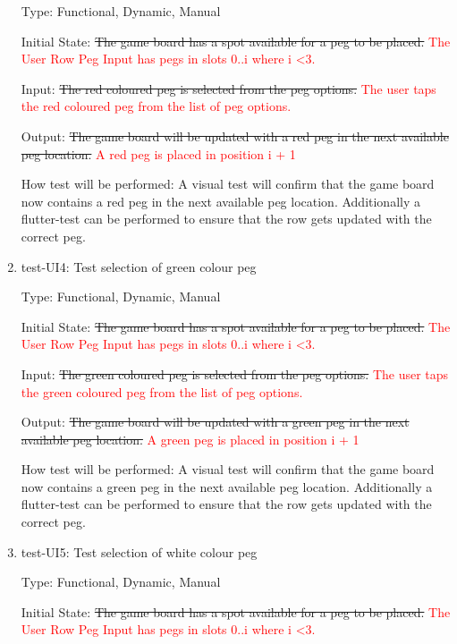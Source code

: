 \documentclass[12pt, titlepage]{article}
\begin{document}
\begin{enumerate}
Type: Functional, Dynamic, Manual
					
Initial State: \sout{The game board has a spot available for a peg to be placed.} \textcolor{red}{The User Row Peg Input has pegs in slots 0..i where i \textless 3.}
					
Input: \sout{The red coloured peg is selected from the peg options.} \textcolor{red}{The user taps the red coloured peg from the list of peg options.}
					
Output: \sout{The game board will be updated with a red peg in the next available peg location.} \textcolor{red}{A red peg is placed in position i + 1}
					
How test will be performed: A visual test will confirm that the game board now contains a red peg in the next available peg location. Additionally a flutter-test can be performed to ensure that the row gets updated with the correct peg.\\

\item{test-UI4: Test selection of green colour peg\\}

Type: Functional, Dynamic, Manual
					
Initial State: \sout{The game board has a spot available for a peg to be placed.} \textcolor{red}{The User Row Peg Input has pegs in slots 0..i where i \textless 3.}
					
Input: \sout{The green coloured peg is selected from the peg options.} \textcolor{red}{The user taps the green coloured peg from the list of peg options.}
					
Output: \sout{The game board will be updated with a green peg in the next available peg location.} \textcolor{red}{A green peg is placed in position i + 1}
					
How test will be performed: A visual test will confirm that the game board now contains a green peg in the next available peg location. Additionally a flutter-test can be performed to ensure that the row gets updated with the correct peg.\\

\item{test-UI5: Test selection of white colour peg\\}

Type: Functional, Dynamic, Manual
					
Initial State: \sout{The game board has a spot available for a peg to be placed.} \textcolor{red}{The User Row Peg Input has pegs in slots 0..i where i \textless 3.}
					

\end{enumerate}
\end{document}
